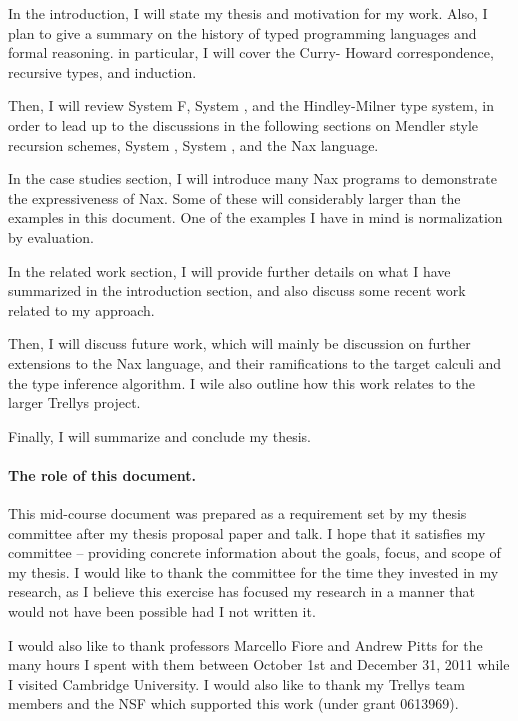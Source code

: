In the introduction, I will state my thesis and motivation for my work.
Also, I plan to give a summary on the history of typed programming
languages and formal reasoning. in particular, I will cover the Curry-
Howard correspondence, recursive types, and induction.

Then, I will review System \textsf{F}, System \Fw, and the Hindley-Milner
type system, in order to lead up to the discussions in the following
sections on Mendler style recursion schemes, System \Fi, System \Fixi, and
the Nax language.

In the case studies section, I will introduce many Nax programs to
demonstrate the expressiveness of Nax. Some of these will considerably
larger than the examples in this document. One of the examples I have in
mind is normalization by evaluation.

In the related work section, I will provide further details on what I have
summarized in the introduction section, and also discuss some recent work
related to my approach.

Then, I will discuss future work, which will mainly be discussion on further
extensions to the Nax language, and their ramifications to
the target calculi and the type inference algorithm. I wile also
outline how this work relates to the larger Trellys project.

Finally, I will summarize and conclude my thesis.

\paragraph{The role of this document.} This mid-course document
was prepared as a requirement set by my thesis committee after
my thesis proposal paper and talk. I hope that it satisfies my
committee -- providing concrete
information about the goals, focus, and scope of my thesis. I would like
to thank the committee for the time they invested in my research, as I believe this
exercise
has focused my research in a manner that would not have been possible had
I not written it.

I would also like to thank professors Marcello Fiore and Andrew Pitts for
the many hours I spent with them between October 1st and December 31, 2011
while I visited Cambridge University. I would also like to thank my Trellys
team members and the NSF which supported this work (under grant 0613969).

